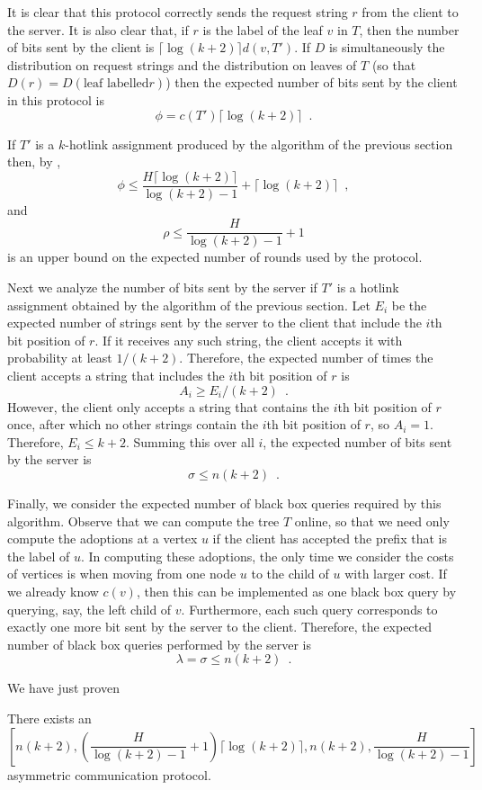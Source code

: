 \documentclass[lotsofwhite]{patmorin}
\newcommand{\sbits}{\sigma}
\newcommand{\cbits}{\phi}
\newcommand{\bbq}{\lambda}
\newcommand{\rounds}{\rho}
\newcommand{\path}{d}
\newcommand{\cost}{c}
\begin{document}
It is clear that this protocol correctly sends the request string $r$
from the client to the server.  It is also clear that, if $r$ is the
label of the leaf $v$ in $T$, then the number of bits sent by the
client is $\lceil\log(k+2)\rceil\path(v,T')$.  If $D$ is
simultaneously the distribution on request strings and the
distribution on leaves of $T$ (so that $D(r)=D(\mbox{leaf labelled
$r$})$) then the expected number of bits sent by the client in this
protocol is
\[
 \cbits = \cost(T')\lceil\log(k+2)\rceil \enspace .
\]

If $T'$ is a $k$-hotlink assignment produced by the algorithm of the
previous section then, by ,
\[
 \cbits \le \frac{H\lceil\log(k+2)\rceil}{\log(k+2)-1}+\lceil\log(k+2)\rceil \enspace ,
\]
and
\[
    \rounds \le \frac{H}{\log(k+2)-1} + 1
\]
is an upper bound on the expected number of rounds used by the protocol.

Next we analyze the number of bits sent by the server if $T'$ is a
hotlink assignment obtained by the algorithm of the previous section.
Let $E_i$ be the expected number of strings sent by the server to the
client that include the $i$th bit position of $r$.  If it receives any
such string, the client accepts it with probability at least
$1/(k+2)$.  Therefore, the expected number of times the client accepts
a string that includes the $i$th bit position of $r$ is
\[
   A_i \ge E_i/(k+2) \enspace .
\]
However, the client only accepts a string that contains the $i$th bit
position of $r$ once, after which no other strings contain the $i$th
bit position of $r$, so $A_i=1$.  Therefore, $E_i\le k+2$.  Summing
this over all $i$, the expected number of bits sent by the server is
\[
   \sbits\le n(k+2) \enspace .
\]

Finally, we consider the expected number of black box queries required
by this algorithm.  Observe that we can compute the tree $T$ online,
so that we need only compute the adoptions at a vertex $u$ if the
client has accepted the prefix that is the label of $u$.  In computing
these adoptions, the only time we consider the costs of vertices is
when moving from one node $u$ to the child of $u$ with larger cost.
If we already know $\cost(v)$, then this can be implemented as one
black box query by querying, say, the left child of $v$.  Furthermore,
each such query corresponds to exactly one more bit sent by the server
to the client.  Therefore, the expected number of black box queries
performed by the server is
\[
   \bbq = \sbits \le n(k+2) \enspace .
\] 

We have just proven
\begin{thm}
There exists an 
\[
\left[ n(k+2), \left(\frac{H}{\log(k+2)-1}+1\right)\lceil\log(k+2)\rceil,
        n(k+2), \frac{H}{\log(k+2)-1} \right]
\]
asymmetric communication protocol.
\end{thm}
\end{document}
